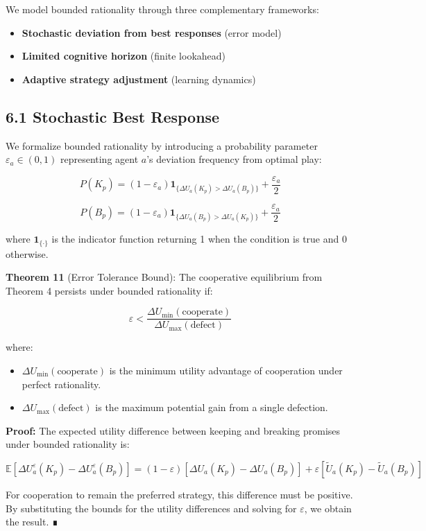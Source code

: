 \documentclass[11pt]{article}
\begin{document}
We model bounded rationality through three complementary frameworks:
\begin{itemize}
\item \textbf{Stochastic deviation from best responses} (error model)
\item \textbf{Limited cognitive horizon} (finite lookahead)
\item \textbf{Adaptive strategy adjustment} (learning dynamics)
\end{itemize}
\subsection{6.1 Stochastic Best Response}
\label{sec:org2377308}
We formalize bounded rationality by introducing a probability parameter \(\varepsilon_a \in (0,1)\) representing agent \(a\)'s deviation frequency from optimal play:

\[
P(K_p) = (1-\varepsilon_a) \mathbf{1}_{\{\Delta U_a(K_p) > \Delta U_a(B_p)\}} + \frac{\varepsilon_a}{2}
\]

\[
P(B_p) = (1-\varepsilon_a) \mathbf{1}_{\{\Delta U_a(B_p) > \Delta U_a(K_p)\}} + \frac{\varepsilon_a}{2}
\]

where \(\mathbf{1}_{\{\cdot\}}\) is the indicator function returning 1 when the condition is true and 0 otherwise.

\textbf{Theorem 11} (Error Tolerance Bound):
The cooperative equilibrium from Theorem 4 persists under bounded rationality if:

\[
\varepsilon < \frac{\Delta U_{\min}(\text{cooperate})}{\Delta U_{\max}(\text{defect})}
\]

where:
\begin{itemize}
\item \(\Delta U_{\min}(\text{cooperate})\) is the minimum utility advantage of cooperation under perfect rationality.
\item \(\Delta U_{\max}(\text{defect})\) is the maximum potential gain from a single defection.
\end{itemize}

\textbf{Proof:}
The expected utility difference between keeping and breaking promises under bounded rationality is:

\[
\mathbb{E}[\Delta U_a^\varepsilon(K_p) - \Delta U_a^\varepsilon(B_p)] = (1-\varepsilon)[\Delta U_a(K_p) - \Delta U_a(B_p)] + \varepsilon[\tilde{U}_a(K_p) - \tilde{U}_a(B_p)]
\]

For cooperation to remain the preferred strategy, this difference must be positive. By substituting the bounds for the utility differences and solving for \(\varepsilon\), we obtain the result. ∎
\end{document}
